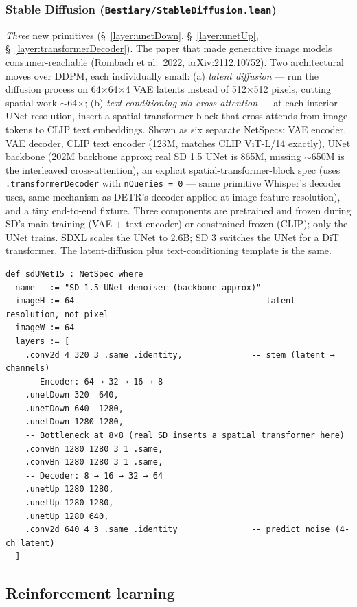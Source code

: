 \subsubsection*{Stable Diffusion (\texttt{Bestiary/StableDiffusion.lean})}
\emph{Three} new primitives (\S~\ref{layer:unetDown}, \S~\ref{layer:unetUp}, \S~\ref{layer:transformerDecoder}). The paper that made generative image
models consumer-reachable (Rombach et al.\ 2022,
\href{https://arxiv.org/abs/2112.10752}{arXiv:2112.10752}). Two architectural
moves over DDPM, each individually small: (a) \emph{latent diffusion}
--- run the diffusion process on 64$\times$64$\times$4 VAE latents
instead of 512$\times$512 pixels, cutting spatial work $\sim$64$\times$;
(b) \emph{text conditioning via cross-attention} --- at each interior
UNet resolution, insert a spatial transformer block that cross-attends
from image tokens to CLIP text embeddings. Shown as six separate
NetSpecs: VAE encoder, VAE decoder, CLIP text encoder (123M, matches
CLIP ViT-L/14 exactly), UNet backbone (202M backbone approx; real
SD 1.5 UNet is 865M, missing $\sim$650M is the interleaved
cross-attention), an explicit spatial-transformer-block spec (uses
\texttt{.transformerDecoder} with \texttt{nQueries = 0} --- same
primitive Whisper's decoder uses, same mechanism as DETR's decoder
applied at image-feature resolution), and a tiny end-to-end fixture.
Three components are pretrained and frozen during SD's main training
(VAE + text encoder) or constrained-frozen
(CLIP); only the UNet trains. SDXL scales the UNet to 2.6B; SD 3
switches the UNet for a DiT transformer. The latent-diffusion plus
text-conditioning template is the same.

\begin{verbatim}
def sdUNet15 : NetSpec where
  name   := "SD 1.5 UNet denoiser (backbone approx)"
  imageH := 64                                    -- latent resolution, not pixel
  imageW := 64
  layers := [
    .conv2d 4 320 3 .same .identity,              -- stem (latent → channels)
    -- Encoder: 64 → 32 → 16 → 8
    .unetDown 320  640,
    .unetDown 640  1280,
    .unetDown 1280 1280,
    -- Bottleneck at 8×8 (real SD inserts a spatial transformer here)
    .convBn 1280 1280 3 1 .same,
    .convBn 1280 1280 3 1 .same,
    -- Decoder: 8 → 16 → 32 → 64
    .unetUp 1280 1280,
    .unetUp 1280 1280,
    .unetUp 1280 640,
    .conv2d 640 4 3 .same .identity               -- predict noise (4-ch latent)
  ]
\end{verbatim}

\subsection{Reinforcement learning}

